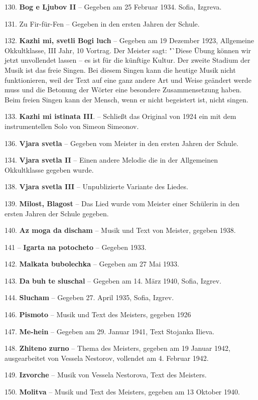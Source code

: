 \documentclass[11pt,a5paper,twoside]{article}
\begin{document}
130. \textbf{Bog e Ljubov II} -- Gegeben am 25 Februar 1934. Sofia, Izgreva.

131. Zu Fir-für-Fen -- Gegeben in den ersten Jahren der Schule.

132. \textbf{Kazhi mi, svetli Bogi luch} -- Gegeben am 19 Dezember 1923, Allgemeine Okkultklasse, III Jahr, 10 Vortrag. Der Meister sagt: "`Diese Übung können wir jetzt unvollendet lassen -- es ist für die künftige Kultur. Der zweite Stadium der Musik ist das freie Singen. Bei diesem Singen kann die heutige Musik nicht funktionieren, weil der Text auf eine ganz andere Art und Weise geändert werde muss und die Betonung der Wörter eine besondere Zusammensetzung haben. Beim freien Singen kann der Mensch, wenn er nicht begeistert ist, nicht singen.

133. \textbf{Kazhi mi istinata III}. -- Schließt das Original von 1924 ein mit dem instrumentellen Solo von Simeon Simeonov.

136. \textbf{Vjara svetla} -- Gegeben vom Meister in den ersten Jahren der Schule.

134. \textbf{Vjara svetla II} -- Einen andere Melodie die in der Allgemeinen Okkultklasse gegeben wurde.

138. \textbf{Vjara svetla III} -- Unpublizierte Variante des Liedes.

139.  \textbf{Milost, Blagost} -- Das Lied wurde vom Meister einer Schülerin in den ersten Jahren der Schule gegeben.

140. \textbf{Az moga da discham} -- Musik und Text von Meister, gegeben 1938.

141 -- \textbf{Igarta na potocheto} -- Gegeben 1933.

142. \textbf{Malkata bubolechka} -- Gegeben am 27 Mai 1933.

143. \textbf{Da buh te sluschal} -- Gegeben am 14. März 1940, Sofia, Izgrev.

144. \textbf{Slucham} -- Gegeben 27. April 1935, Sofia, Izgrev.

146. \textbf{Pismoto} -- Musik und Text des Meisters, gegeben 1926

147. \textbf{Me-hein} -- Gegeben am 29. Januar 1941, Text Stojanka Ilieva.

148. \textbf{Zhiteno zurno} -- Thema des Meisters, gegeben am 19 Januar 1942, ausgearbeitet von Vessela Nestorov, vollendet am 4. Februar 1942.

149. \textbf{Izvorche} -- Musik von Vessela Nestorova, Text des Meisters.

150. \textbf{Molitva} -- Musik und Text des Meisters, gegeben am 13 Oktober 1940.
\end{document}
